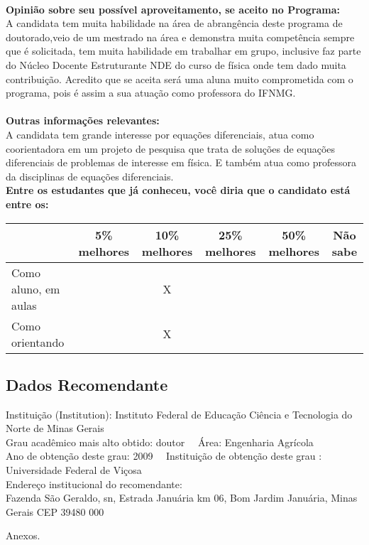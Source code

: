 \documentclass[11pt]{article}
\begin{document}
\\
\textbf{Opinião sobre seu possível aproveitamento, se aceito no Programa:}
\\A candidata tem muita habilidade na área de abrangência deste programa de doutorado,veio de um mestrado na área e demonstra muita competência sempre que é solicitada, tem muita habilidade em trabalhar em grupo, inclusive faz  parte do Núcleo Docente Estruturante NDE do curso de física onde tem dado muita contribuição. Acredito que se aceita será uma aluna muito comprometida com o programa, pois é assim a sua atuação como professora do IFNMG.\\ 
\\
\textbf{Outras informações relevantes:} \\A candidata tem grande interesse por equações diferenciais, atua como coorientadora em um projeto de pesquisa que trata de soluções de equações diferenciais de problemas de interesse em física. E também atua como professora da disciplinas de equações diferenciais.
\\[0.3cm]
\textbf{Entre os estudantes que já conheceu, você diria que o candidato está entre os:}
\\
\begin{tabular}{|l|c|c|c|c|c|}
\hline
 & 5\% melhores & 10\% melhores & 25\% melhores & 50\% melhores & Não sabe \\
\hline
Como aluno, em aulas &  & X &  &  & \\
\hline
Como orientando &  & X &  &  & \\
\hline
\end{tabular}
\subsection*{Dados Recomendante} 
	Instituição (Institution): Instituto Federal de Educação Ciência e Tecnologia do Norte de Minas Gerais
\\ 
	Grau acadêmico mais alto obtido: doutor
	\ \ Área: Engenharia Agrícola
	\\
	Ano de obtenção deste grau: 2009
	\ \ 
	Instituição de obtenção deste grau : Universidade Federal de Viçosa
	\\ 
	Endereço institucional do recomendante: \\ Fazenda São Geraldo, sn, Estrada Januária km 06, Bom Jardim
Januária, Minas Gerais CEP 39480 000 
\begin{center}
Anexos.
\end{center}
\end{document}

